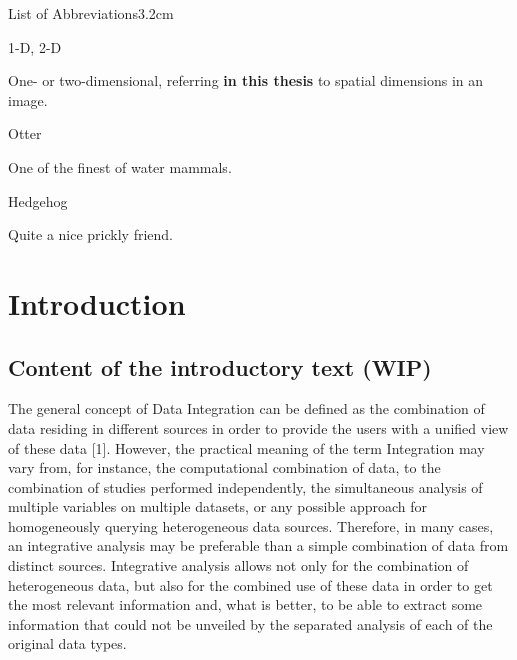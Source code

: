 \documentclass[a4paper, nobind]{templates/ociamthesis}
\renewcommand{\chaptermark}[1]{\markboth{\thechapter. #1}{\thechapter. #1}}
\begin{document}
\begin{romanpages}
\listoftables
  \mtcaddchapter
\begin{mclistof}{List of Abbreviations}{3.2cm}

\item[1-D, 2-D]

One- or two-dimensional, referring \textbf{in this thesis} to spatial dimensions in an image.

\item[Otter]

One of the finest of water mammals.

\item[Hedgehog]

Quite a nice prickly friend.

\end{mclistof} 


\end{romanpages}

\flushbottom

\hypertarget{intro}{%
\chapter{Introduction}\label{intro}}

\chaptermark{Introduction}

\minitoc 

\hypertarget{content-of-the-introductory-text-wip}{%
\section{Content of the introductory text (WIP)}\label{content-of-the-introductory-text-wip}}

The general concept of Data Integration can be defined as the combination of data residing in different sources in order to provide the users with a unified view of these data {[}1{]}. However, the practical meaning of the term Integration may vary from, for instance, the computational combination of data, to the combination of studies performed independently, the simultaneous analysis of multiple variables on multiple datasets, or any possible approach for homogeneously querying heterogeneous data sources. Therefore, in many cases, an integrative analysis may be preferable than a simple combination of data from distinct sources. Integrative analysis allows not only for the combination of heterogeneous data, but also for the combined use of these data in order to get the most relevant information and, what is better, to be able to extract some information that could not be unveiled by the separated analysis of each of the original data types.
\end{document}
